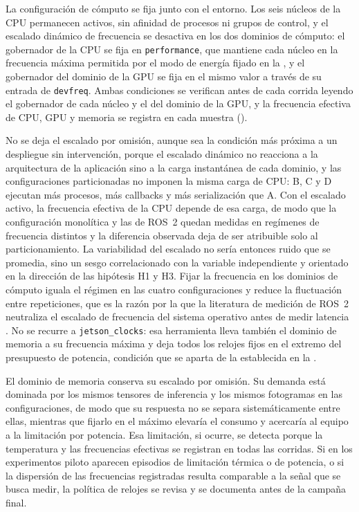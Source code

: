 La configuración de cómputo se fija junto con el entorno. Los seis núcleos de
la CPU permanecen activos, sin afinidad de procesos ni grupos de control, y el
escalado dinámico de frecuencia se desactiva en los dos dominios de cómputo: el
gobernador de la CPU se fija en \texttt{performance}, que mantiene cada núcleo
en la frecuencia máxima permitida por el modo de energía fijado en la
, y el gobernador del dominio de la GPU se fija en el mismo
valor a través de su entrada de \texttt{devfreq}. Ambas condiciones se
verifican antes de cada corrida leyendo el gobernador de cada núcleo y el del
dominio de la GPU, y la frecuencia efectiva de CPU, GPU y memoria se registra
en cada muestra ().

No se deja el escalado por omisión, aunque sea la condición más próxima a un
despliegue sin intervención, porque el escalado dinámico no reacciona a la
arquitectura de la aplicación sino a la carga instantánea de cada dominio, y
las configuraciones particionadas no imponen la misma carga de CPU: B, C y
D ejecutan más procesos, más callbacks y más serialización que A. Con el
escalado activo, la
frecuencia efectiva de la CPU depende de esa carga, de modo que la
configuración monolítica y las de ROS~2 quedan medidas en regímenes de
frecuencia distintos y la diferencia observada deja de ser atribuible solo al
particionamiento. La variabilidad del escalado no sería entonces ruido que se
promedia, sino un sesgo correlacionado con la variable independiente y
orientado en la dirección de las hipótesis H1 y H3. Fijar la frecuencia en los
dominios de cómputo iguala el régimen en las cuatro configuraciones y reduce la
fluctuación entre repeticiones, que es la razón por la que la literatura de
medición de ROS~2 neutraliza el escalado de frecuencia del sistema operativo
antes de medir latencia \cite{kronauer2021}. No se recurre a
\texttt{jetson\_clocks}: esa herramienta lleva también el dominio de memoria a
su frecuencia máxima y deja todos los relojes fijos en el extremo del
presupuesto de potencia, condición que se aparta de la establecida en la
.

El dominio de memoria conserva su escalado por omisión. Su demanda está
dominada por los mismos tensores de inferencia y los mismos fotogramas en las
configuraciones, de modo que su respuesta no se separa sistemáticamente
entre ellas, mientras que fijarlo en el máximo elevaría el consumo y acercaría
al equipo a la limitación por potencia. Esa limitación, si ocurre, se detecta
porque la temperatura y las frecuencias efectivas se registran en todas las
corridas. Si en los experimentos piloto aparecen episodios de limitación
térmica o de potencia, o si la dispersión de las frecuencias registradas
resulta comparable a la señal que se busca medir, la política de relojes se
revisa y se documenta antes de la campaña final.


